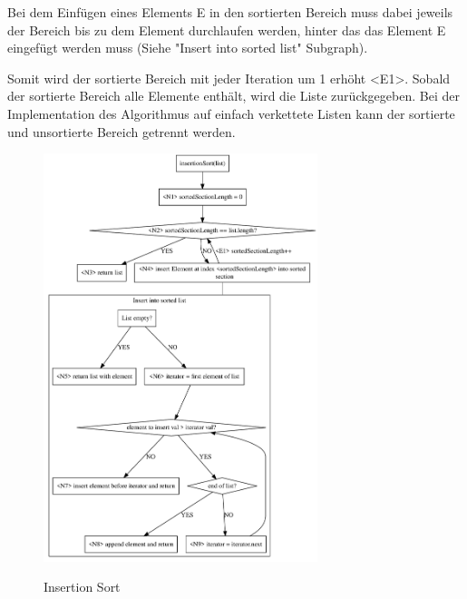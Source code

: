 \documentclass[11pt]{article}
\begin{document}
    Bei dem Einfügen eines Elements E in den sortierten Bereich muss dabei
    jeweils der Bereich bis zu dem Element durchlaufen werden, hinter das das
    Element E eingefügt werden muss (Siehe "Insert into sorted list" Subgraph).

    Somit wird der sortierte Bereich mit jeder Iteration um 1 erhöht <E1>.
    Sobald der sortierte Bereich alle Elemente enthält, wird die Liste
    zurückgegeben.
    Bei der Implementation des Algorithmus auf einfach verkettete Listen
    kann der sortierte und unsortierte Bereich getrennt werden.

    \begin{figure}[hbt]
        \caption{Insertion Sort}
        \centering
        \includegraphics[width = 8cm]{insertionS}\label{fig:insertionS}
    \end{figure}
\end{document}

